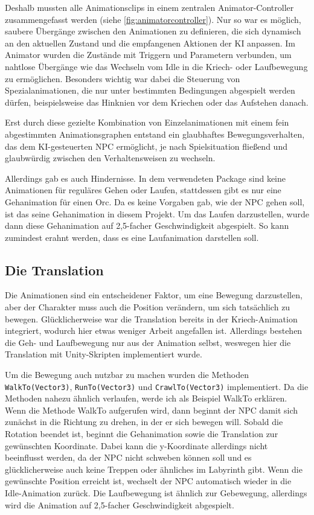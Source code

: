 \documentclass[a4paper]{article}
\begin{document}
Deshalb mussten alle Animationsclips in einem zentralen Animator-Controller zusammengefasst werden (siehe \autoref{fig:animatorcontroller}). Nur so war es möglich, saubere Übergänge zwischen den Animationen zu definieren, die sich dynamisch an den aktuellen Zustand und die empfangenen Aktionen der KI anpassen. Im Animator wurden die Zustände mit Triggern und Parametern verbunden, um nahtlose Übergänge wie das Wechseln vom Idle in die Kriech- oder Laufbewegung zu ermöglichen. Besonders wichtig war dabei die Steuerung von Spezialanimationen, die nur unter bestimmten Bedingungen abgespielt werden dürfen, beispielsweise das Hinknien vor dem Kriechen oder das Aufstehen danach.

Erst durch diese gezielte Kombination von Einzelanimationen mit einem fein abgestimmten Animationsgraphen entstand ein glaubhaftes Bewegungsverhalten, das dem KI-gesteuerten NPC ermöglicht, je nach Spielsituation fließend und glaubwürdig zwischen den Verhaltensweisen zu wechseln.

Allerdings gab es auch Hindernisse. In dem verwendeten Package sind keine Animationen für reguläres Gehen oder Laufen, stattdessen gibt es nur eine Gehanimation für einen Orc. Da es keine Vorgaben gab, wie der NPC gehen soll, ist das seine Gehanimation in diesem Projekt. Um das Laufen darzustellen, wurde dann diese Gehanimation auf 2,5-facher Geschwindigkeit abgespielt. So kann zumindest erahnt werden, dass es eine Laufanimation darstellen soll. 

\subsection{Die Translation}
Die Animationen sind ein entscheidener Faktor, um eine Bewegung darzustellen, aber der Charakter muss auch die Position verändern, um sich tatsächlich zu bewegen. Glücklicherweise war die Translation bereits in der Kriech-Animation integriert, wodurch hier etwas weniger Arbeit angefallen ist. Allerdings bestehen die Geh- und Laufbewegung nur aus der Animation selbst, weswegen hier die Translation mit Unity-Skripten implementiert wurde.

Um die Bewegung auch nutzbar zu machen wurden die Methoden \texttt{WalkTo(Vector3)}, \texttt{RunTo(Vector3)} und \texttt{CrawlTo(Vector3)} implementiert. Da die Methoden nahezu ähnlich verlaufen, werde ich als Beispiel WalkTo erklären. Wenn die Methode WalkTo aufgerufen wird, dann beginnt der NPC damit sich zunächst in die Richtung zu drehen, in der er sich bewegen will. Sobald die Rotation beendet ist, beginnt die Gehanimation sowie die Translation zur gewünschten Koordinate. Dabei kann die y-Koordinate allerdings nicht beeinflusst werden, da der NPC nicht schweben können soll und es glücklicherweise auch keine Treppen oder ähnliches im Labyrinth gibt. Wenn die gewünschte Position erreicht ist, wechselt der NPC automatisch wieder in die Idle-Animation zurück. Die Laufbewegung ist ähnlich zur Gebewegung, allerdings wird die Animation auf 2,5-facher Geschwindigkeit abgespielt.
\end{document}
